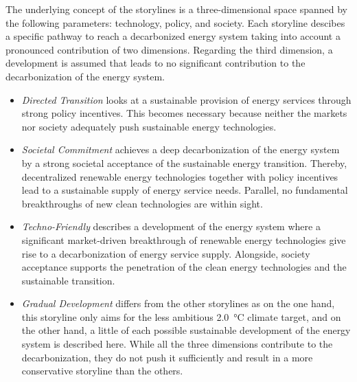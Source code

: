 
The underlying concept of the storylines is a three-dimensional space spanned by the following parameters: technology, policy, and society. Each storyline descibes a specific pathway to reach a decarbonized energy system taking into account a pronounced contribution of two dimensions. Regarding the third dimension, a development is assumed that leads to no significant contribution to the decarbonization of the energy system. 

\begin{itemize}
	\item \textit{Directed Transition} looks at a sustainable provision of energy services through strong policy incentives. This becomes necessary because neither the markets nor society adequately push sustainable energy technologies.
	\item \textit{Societal Commitment} achieves a deep decarbonization of the energy system by a strong societal acceptance of the sustainable energy transition. Thereby, decentralized renewable energy technologies together with policy incentives lead to a sustainable supply of energy service needs. Parallel, no fundamental breakthroughs of new clean technologies are within sight.
	\item \textit{Techno-Friendly} describes a development of the energy system where a significant market-driven breakthrough of renewable energy technologies give rise to a decarbonization of energy service supply. Alongside, society acceptance supports the penetration of the clean energy technologies and the sustainable transition.
	\item \textit{Gradual Development} differs from the other storylines as on the one hand, this storyline only aims for the less ambitious \SI{2.0}{\degreeCelsius} climate target, and on the other hand, a little of each possible sustainable development of the energy system is described here. While all the three dimensions contribute to the decarbonization, they do not push it sufficiently and result in a more conservative storyline than the others.
\end{itemize}

